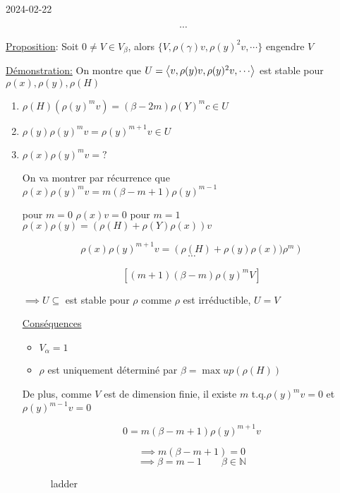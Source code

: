 


2024-02-22

\begin{tcolorbox}[title=Rappels ]
	\[ \dotsb \]
\end{tcolorbox}

\underline{Proposition}: Soit \(0 \neq V \in V_\beta\), alors \(\{ V, \rho(\gamma) v, \rho(y)^2 v, \dotsb \} \) engendre \(V\) 

\underline{Démonstration:} On montre que \(U = \expval{v, \rho(y)v, \rho(y)^2 v, \dotsb}\) est stable pour \(\rho(x), \rho(y), \rho(H)\)

\begin{enumerate}
	\item \(\rho(H) (\rho(y)^m v) = \left( \beta -2m \right)\rho(Y)^m c \in U \)
	\item \(\rho(y) \rho(y)^m v = \rho(y)^{m+1}v \in U\)
	\item \(\rho(x) \rho(y)^m v =?\)

		On va montrer par récurrence que \(\rho(x) \rho(y)^m v = m(\beta-m+1) \rho(y)^{m-1}\)

	pour \(m=0 \) \(\rho(x) v = 0\)
	pour \(m=1\) \( \rho(x)\rho(y) = \left( \rho(H) + \rho(Y)\rho(x) \right)v \)

	\[ \rho(x) \rho(y)^{m+1} v = \left( \rho(H) + \rho(y) \rho(x)) \rho^{m} \right)  \]
	\[ \dotsb \]

	\[ \left[ \left( m+1 \right) \left( \beta -m \right) \rho(y)^m V \right]  \]

\(\implies U \subseteq \) est stable pour \(\rho\) comme \(\rho\) est irréductible, \(U=V\)


\underline{Conséquences} 

\begin{itemize}
	\item \(V_{\alpha} =1\)
	\item \(\rho\) est uniquement déterminé par \(\beta = {\max} up(\rho(H))\)
\end{itemize}

De plus, comme \(V\) est de dimension finie, il existe \(m\) t.q.\(\rho(y)^m v = 0\) et \(\rho(y)^{m-1} v = 0\)

\[ 0 = m(\beta -m+1)\rho(y)^{m+1} v \]

\[ \implies m(\beta-m+1) =0 \]
\[ \implies \beta = m -1 \qquad \beta \in \mathds{N}\]

\begin{figure}[ht]
    \centering
    \caption{ladder}
    \label{fig:ladder}
\end{figure}

\end{enumerate}

